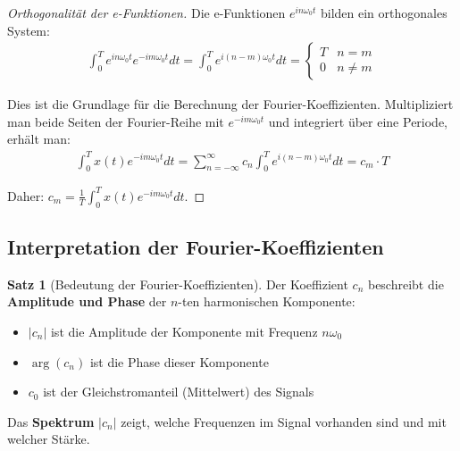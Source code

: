 ﻿\documentclass[a4paper,12pt]{report}
\theoremstyle{definition}
\newtheorem{satz}{Satz}
\begin{document}
	\begin{proof}[Orthogonalität der e-Funktionen]
		Die e-Funktionen $e^{i n \omega_0 t}$ bilden ein orthogonales System:
		\begin{align}
			\int_0^T e^{i n \omega_0 t} e^{-i m \omega_0 t} dt = \int_0^T e^{i (n-m) \omega_0 t} dt = \begin{cases} T & n = m \\ 0 & n \neq m \end{cases}
		\end{align}
		
		Dies ist die Grundlage für die Berechnung der Fourier-Koeffizienten. Multipliziert man beide Seiten der Fourier-Reihe mit $e^{-i m \omega_0 t}$ und integriert über eine Periode, erhält man:
		\begin{align}
			\int_0^T x(t) e^{-i m \omega_0 t} dt = \sum_{n=-\infty}^{\infty} c_n \int_0^T e^{i (n-m) \omega_0 t} dt = c_m \cdot T
		\end{align}
		
		Daher: $c_m = \frac{1}{T} \int_0^T x(t) e^{-i m \omega_0 t} dt$.
	\end{proof}
	
	\subsection{Interpretation der Fourier-Koeffizienten}
	
	\begin{satz}[Bedeutung der Fourier-Koeffizienten]
		Der Koeffizient $c_n$ beschreibt die \textbf{Amplitude und Phase} der $n$-ten harmonischen Komponente:
		\begin{itemize}
			\item[-] $|c_n|$ ist die Amplitude der Komponente mit Frequenz $n \omega_0$
			\item[-] $\arg(c_n)$ ist die Phase dieser Komponente
			\item[-] $c_0$ ist der Gleichstromanteil (Mittelwert) des Signals
		\end{itemize}
		
		Das \textbf{Spektrum} $|c_n|$ zeigt, welche Frequenzen im Signal vorhanden sind und mit welcher Stärke.
	\end{satz}
	
\end{document}
